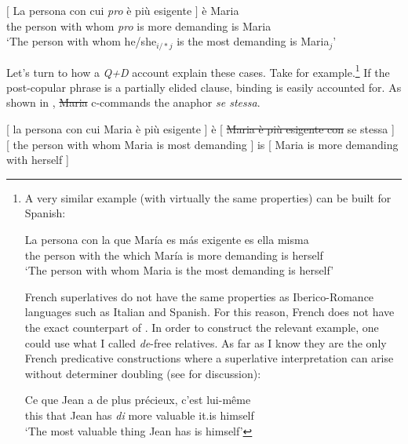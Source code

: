 \documentclass[output=paper,colorlinks,citecolor=brown,draft,draftmode]{langscibook}
\begin{document}
\ea
\gll \label{lapersona2}$[$ La persona con cui \textit{pro} è più esigente $]$ è Maria \\
{} the person with whom \textit{pro} is more demanding {} is Maria\\
\glt `The person with whom he/she$_{i/*j}$ is the most demanding is Maria$_{j}$'
\z


\z

Let's turn to how a \textit{Q+D} account explain these cases. Take  for example.\footnote{A
  very similar example (with virtually the same properties) can be built for Spanish:

  \ea
  \gll La persona con la que Mar\'ia es m\'as exigente es {ella misma}  \\
  the person with the which Mar\'ia is more demanding is herself\\
  \glt `The person with whom Maria is the most demanding is herself'
  \z

  French superlatives do not have the same properties as Iberico-Romance languages such as Italian and Spanish. For this reason, French does not have the exact counterpart of . In order  to construct the relevant example, one could use what I called \textit{de}-free relatives. As far as I know they are the only French predicative constructions where a superlative interpretation can arise without determiner doubling (see \cite{loccioni2018phd} for discussion):


  \ea
  \gll Ce que Jean a de plus pr\'ecieux, c'est {lui-m\^eme}\\
  this that Jean has \textit{di} more valuable it.is  himself\\
  \glt  `The most valuable thing Jean has is himself'
  \z

}
If the post-copular phrase  is a partially elided clause, binding is easily accounted for. As shown in , \sout{Maria} c-commands the anaphor \textit{se stessa}.

\ea
\gll \label{esempioprob}{[ la persona con cui Maria è più esigente ]} è {[ \sout{Maria è più esigente con} se stessa  ]} \\
{[ the person with whom Maria is most demanding ]} is {[ Maria is more demanding with  herself ]}\\
\z
\end{document}
